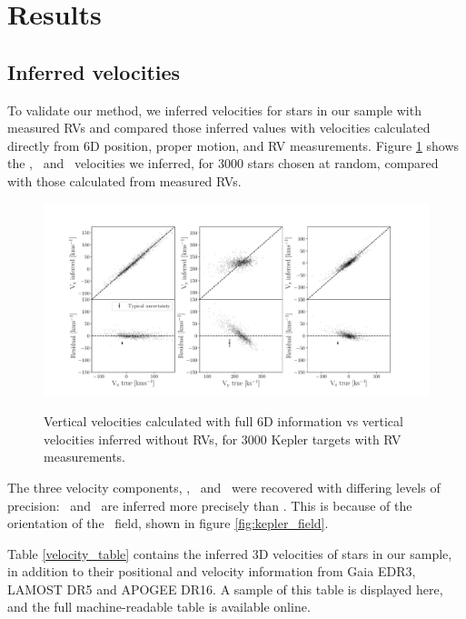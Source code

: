 \section{Results}
\label{sec:results}

\subsection{Inferred velocities}

To validate our method, we inferred velocities for stars in our sample with
measured RVs and compared those inferred values with velocities calculated
directly from 6D position, proper motion, and RV measurements.
Figure \ref{fig:residuals} shows the \vx, \vy\ and \vz\ velocities we
inferred, for 3000 stars chosen at random, compared with those calculated from
measured RVs.
\begin{figure}[ht!]
\caption{Vertical velocities calculated with full 6D information vs vertical
    velocities inferred without RVs, for 3000 Kepler targets with RV
    measurements.}
  \centering
    \includegraphics[width=1\textwidth]{residuals}
\label{fig:residuals}
\end{figure}

The three velocity components, \vx, \vy\ and \vz\ were recovered with
differing levels of precision: \vx\ and \vz\ are inferred more precisely than
\vy.
This is because of the orientation of the \kepler\ field, shown in figure
\ref{fig:kepler_field}.

Table \ref{velocity_table} contains the inferred 3D velocities of stars in our
sample, in addition to their positional and velocity information from
Gaia EDR3, LAMOST DR5 and APOGEE DR16.
A sample of this table is displayed here, and the full machine-readable table
is available online.
